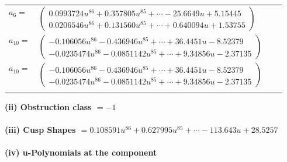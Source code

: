 \documentclass[1p]{elsarticle_modified}
\theoremstyle{definition}
\begin{document}
\begin{tabular}{m{7pt} m{180pt} m{7pt} m{180pt} }
\flushright $a_{6}=$&$\begin{pmatrix}0.0993724 u^{86}+0.357805 u^{85}+\cdots-25.6649 u+5.15445\\0.0206546 u^{86}+0.131560 u^{85}+\cdots+0.640094 u+1.53755\end{pmatrix}$ \\
\flushright $a_{10}=$&$\begin{pmatrix}-0.106056 u^{86}-0.436946 u^{85}+\cdots+36.4451 u-8.52379\\-0.0235474 u^{86}-0.0851142 u^{85}+\cdots+9.34856 u-2.37135\end{pmatrix}$\\ \flushright $a_{10}=$&$\begin{pmatrix}-0.106056 u^{86}-0.436946 u^{85}+\cdots+36.4451 u-8.52379\\-0.0235474 u^{86}-0.0851142 u^{85}+\cdots+9.34856 u-2.37135\end{pmatrix}$\\&\end{tabular}
\flushleft \textbf{(ii) Obstruction class $= -1$}\\~\\
\flushleft \textbf{(iii) Cusp Shapes $= 0.108591 u^{86}+0.627995 u^{85}+\cdots-113.643 u+28.5257$}\\~\\
\newpage\renewcommand{\arraystretch}{1}
\flushleft \textbf{(iv) u-Polynomials at the component}\newline \\
\end{document}
